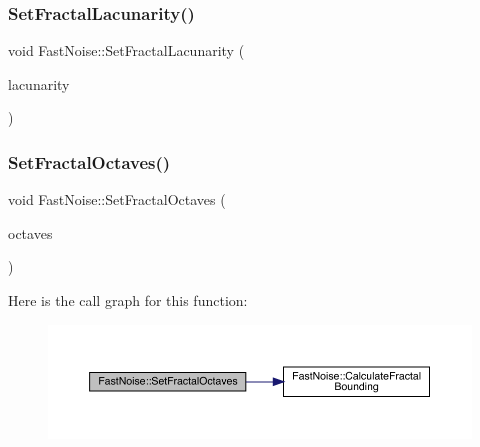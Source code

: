\subsubsection{\texorpdfstring{Set\+Fractal\+Lacunarity()}{SetFractalLacunarity()}}
{\footnotesize\ttfamily void Fast\+Noise\+::\+Set\+Fractal\+Lacunarity (\begin{DoxyParamCaption}\item[{\mbox{\hyperlink{_fast_noise_8h_a75a9ef6d2541c4921815b885bfd449c3}{F\+N\+\_\+\+D\+E\+C\+I\+M\+AL}}}]{lacunarity }\end{DoxyParamCaption})\hspace{0.3cm}{\ttfamily [inline]}}

\mbox{\label{class_fast_noise_a7c7254a79a239e8014fd0078cee007dd}} 
\subsubsection{\texorpdfstring{Set\+Fractal\+Octaves()}{SetFractalOctaves()}}
{\footnotesize\ttfamily void Fast\+Noise\+::\+Set\+Fractal\+Octaves (\begin{DoxyParamCaption}\item[{int}]{octaves }\end{DoxyParamCaption})\hspace{0.3cm}{\ttfamily [inline]}}

Here is the call graph for this function\+:
\nopagebreak
\begin{figure}[H]
\begin{center}
\leavevmode
\includegraphics[width=350pt]{class_fast_noise_a7c7254a79a239e8014fd0078cee007dd_cgraph}
\end{center}
\end{figure}
\mbox{\label{class_fast_noise_ad5ebb22802d87f7eb425a711658e47d8}} 

